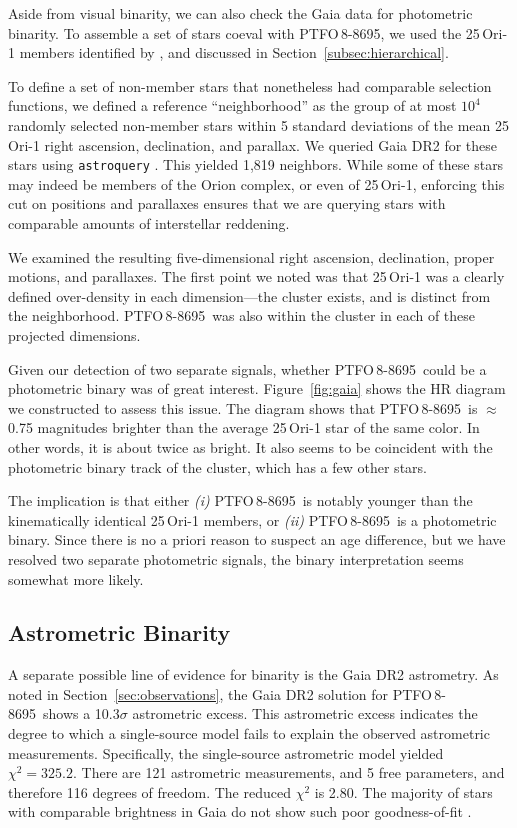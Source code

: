 \documentclass[12pt,twocolumn,tighten]{aastex62}
\newcommand{\ptfo}{PTFO$\,$8-8695}
\begin{document}
Aside from visual binarity, we can also check the Gaia data for
photometric binarity.  To assemble a set of stars coeval with \ptfo,
we used the 25$\,$Ori-1 members identified by
\citet{kounkel_apogee2_2018}, and discussed in
Section~\ref{subsec:hierarchical}.

To define a set of non-member stars that nonetheless had comparable
selection functions, we defined a reference ``neighborhood'' as the
group of at most $10^4$ randomly selected non-member stars within 5
standard deviations of the mean 25$\,$Ori-1 right ascension,
declination, and parallax.  We queried Gaia DR2 for these stars using
\texttt{astroquery} \citep{astroquery_2018}.  This yielded 1{,}819
neighbors.  While some of these stars may indeed be members of the
Orion complex, or even of 25$\,$Ori-1, enforcing this cut on positions
and parallaxes ensures that we are querying stars with comparable
amounts of interstellar reddening.

We examined the resulting five-dimensional right ascension,
declination, proper motions, and parallaxes.  The first point we noted
was that 25$\,$Ori-1 was a clearly defined over-density in each
dimension---the cluster exists, and is distinct from the neighborhood.
\ptfo\ was also within the cluster in each of these projected
dimensions.

Given our detection of two separate signals, whether \ptfo\ could be a
photometric binary was of great interest.  Figure~\ref{fig:gaia} shows
the HR diagram we constructed to assess this issue.  The diagram shows
that \ptfo\ is $\approx$0.75 magnitudes brighter than the average
25$\,$Ori-1 star of the same color.  In other words, it is about twice
as bright.  It also seems to be coincident with the photometric binary
track of the cluster, which has a few other stars.

The implication is that either {\it (i)} \ptfo\ is notably younger
than the kinematically identical 25$\,$Ori-1 members, or {\it (ii)}
\ptfo\ is a photometric binary.  Since there is no a priori reason to
suspect an age difference, but we have resolved two separate
photometric signals, the binary interpretation seems somewhat more
likely.


\subsection{Astrometric Binarity}

A separate possible line of evidence for binarity is the Gaia DR2
astrometry.  As noted in Section~\ref{sec:observations}, the Gaia DR2
solution for \ptfo\ shows a 10.3$\sigma$ astrometric excess.  This
astrometric excess indicates the degree to which a single-source model
fails to explain the observed astrometric measurements.  Specifically,
the single-source astrometric model yielded $\chi^2=325.2$.  There are
121 astrometric measurements, and 5 free parameters, and therefore 116
degrees of freedom. The reduced $\chi^2$ is 2.80.  The majority of
stars with comparable brightness in Gaia do not show such poor
goodness-of-fit \citep[][Appendix A]{lindegren_gaiasoln_2018}.
\end{document}
